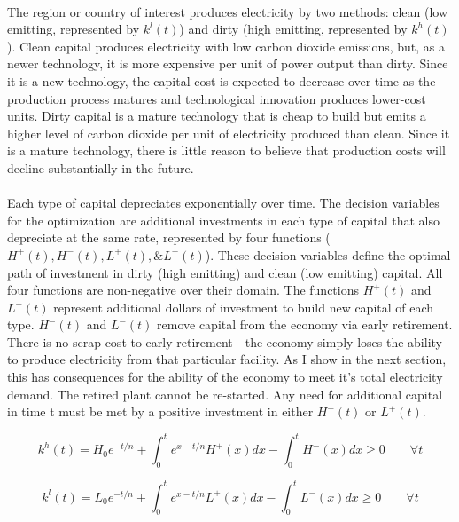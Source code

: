 \documentclass{easychithesis}
\begin{document}
\paragraph{} The region or country of interest produces electricity by two methods: clean (low emitting, represented by $k^l(t)$) and dirty (high emitting, represented by $k^h(t)$). Clean capital produces electricity with low carbon dioxide emissions, but, as a newer technology, it is more expensive per unit of power output than dirty. Since it is a new technology, the capital cost is expected to decrease over time as the production process matures and technological innovation produces lower-cost units. Dirty capital is a mature technology that is cheap to build but emits a higher level of carbon dioxide per unit of electricity produced than clean. Since it is a mature technology, there is little reason to believe that production costs will decline substantially in the future. 


\paragraph{} Each type of capital depreciates exponentially over time. The decision variables for the optimization are additional investments in each type of capital that also depreciate at the same rate, represented by four functions ($H^+(t), H^-(t), L^+(t), \& L^-(t)$). These decision variables define the optimal path of investment in dirty (high emitting) and clean (low emitting) capital. All four functions are non-negative over their domain. The functions $H^+(t)$ and $L^+(t)$ represent additional dollars of investment to build new capital of each type. $H^-(t)$ and $L^-(t)$ remove capital from the economy via early retirement. There is no scrap cost to early retirement - the economy simply loses the ability to produce electricity from that particular facility. As I show in the next section, this has consequences for the ability of the economy to meet it's total electricity demand. The retired plant cannot be re-started. Any need for additional capital in time t must be met by a positive investment in either $H^+(t)$ or $L^+(t)$. 

\begin{equation}\label{eq:simpleHCapitalConstraint}
k^h(t) = H_0 e^{-t/n} + \int_0^t e^{x-t/n} H^+(x) dx - \int_0^t H^-(x)dx \geq 0 \qquad \forall t
\end{equation}

\begin{equation}\label{eq:simpleLCapitalConstraint}
k^l(t) = L_0 e^{-t/n} + \int_0^t e^{x-t/n} L^+(x) dx - \int_0^t L^-(x)dx \geq 0 \qquad \forall t
\end{equation}
\end{document}
